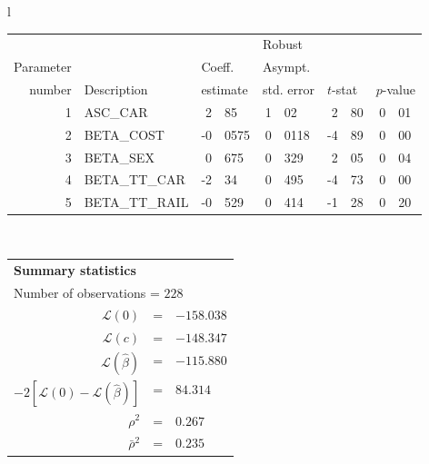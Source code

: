  \begin{tabular}{l}
\begin{tabular}{rlr@{.}lr@{.}lr@{.}lr@{.}l}
         &                       &   \multicolumn{2}{l}{}    & \multicolumn{2}{l}{Robust}  &     \multicolumn{4}{l}{}   \\
Parameter &                       &   \multicolumn{2}{l}{Coeff.}      & \multicolumn{2}{l}{Asympt.}  &     \multicolumn{4}{l}{}   \\
number &  Description                     &   \multicolumn{2}{l}{estimate}      & \multicolumn{2}{l}{std. error}  &   \multicolumn{2}{l}{$t$-stat}  &   \multicolumn{2}{l}{$p$-value}   \\

\hline

1 & ASC\_CAR & 2&85 & 1&02 & 2&80 & 0&01 \\
2 & BETA\_COST & -0&0575 & 0&0118 & -4&89 & 0&00 \\
3 & BETA\_SEX & 0&675 & 0&329 & 2&05 & 0&04 \\
4 & BETA\_TT\_CAR & -2&34 & 0&495 & -4&73 & 0&00 \\
5 & BETA\_TT\_RAIL & -0&529 & 0&414 & -1&28 & 0&20 \\
\hline

\end{tabular}
\\
\begin{tabular}{rcl}
\multicolumn{3}{l}{\bf Summary statistics}\\
\multicolumn{3}{l}{ Number of observations = $228$} \\
 $\mathcal{L}(0)$ &=&  $-158.038$ \\
 $\mathcal{L}(c)$ &=& $-148.347$\\
 $\mathcal{L}(\hat{\beta})$ &=& $-115.880 $  \\
 $-2[\mathcal{L}(0) -\mathcal{L}(\hat{\beta})]$ &=& $84.314$ \\
    $\rho^2$ &=&   $0.267$ \\
    $\bar{\rho}^2$ &=&    $0.235$ \\
\end{tabular}
\end{tabular}


